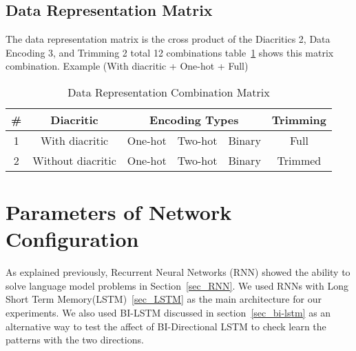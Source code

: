   \subsection{Data Representation Matrix}

  The data representation matrix is the cross product of the Diacritics 2, Data Encoding 3, and Trimming 2 total 12 combinations table~\ref{table:data_representation_matrix} shows this matrix combination. Example (With diacritic + One-hot + Full)

  
\begin{table}[H]
  \centering
  \begin{tabular}{c c c c c c}
    \hline
    \textbf{\#} & \textbf{Diacritic} & \multicolumn{3}{c}{\textbf{Encoding Types}}  & \textbf{Trimming} \\
    
    \hline
    1 & With diacritic & One-hot & Two-hot & Binary & Full    \\
        \hline
    2 & Without diacritic & One-hot & Two-hot & Binary & Trimmed \\
\hline
 \end{tabular}
  \caption{Data Representation Combination Matrix}\label{table:data_representation_matrix}
\end{table}


%	



\section{Parameters of Network Configuration}\label{sec_rnn_param}

As explained previously, Recurrent Neural Networks (RNN) showed the ability to solve language model problems in Section~\ref{sec_RNN}. We used RNNs with Long Short Term Memory(LSTM)~\ref{sec_LSTM} as the main architecture for our experiments. We also used BI-LSTM discussed in section~\ref{sec_bi-lstm} as an alternative way to test the affect of BI-Directional LSTM to check learn the patterns with the two directions.

